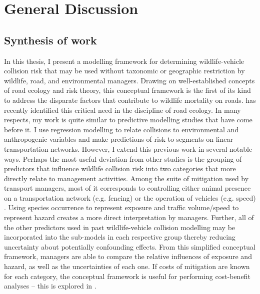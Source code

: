 \chapter{General Discussion}\label{sec:conc}
\newpage

\section{Synthesis of work}

In this thesis, I present a modelling framework for determining wildlife-vehicle collision risk that may be used without taxonomic or geographic restriction by wildlife, road, and environmental managers. Drawing on well-established concepts of road ecology and risk theory, this conceptual framework is the first of its kind to address the disparate factors that contribute to wildlife mortality on roads. \cite{clev15} has recently identified this critical need in the discipline of road ecology. In many respects, my work is quite similar to predictive modelling studies that have come before it. I use regression modelling to relate collisions to environmental and anthropogenic variables and make predictions of risk to segments on linear transportation networks. However, I extend this previous work in several notable ways. Perhaps the most useful deviation from other studies is the grouping of predictors that influence wildlife collision risk into two categories that more directly relate to management activities. Among the suite of mitigation used by transport managers, most of it corresponds to controlling either animal presence on a transportation network (e.g. fencing) or the operation of vehicles (e.g. speed) \citep{glis09}.  Using species occurrence to represent exposure and traffic volume/speed to represent hazard creates a more direct interpretation by managers. Further, all of the other predictors used in past wildlife-vehicle collision modelling may be incorporated into the sub-models in each respective group thereby reducing uncertainty about potentially confounding effects. From this simplified conceptual framework, managers are able to compare the relative influences of exposure and hazard, as well as the uncertainties of each one. If costs of mitigation are known for each category, the conceptual framework is useful for performing cost-benefit analyses -- this is explored in .


